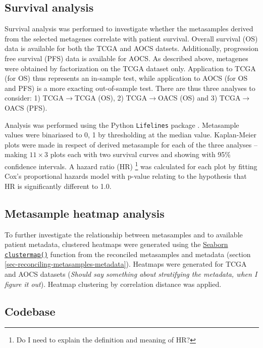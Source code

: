 \documentclass[draft, tikz, 12pt,a4paper,oneside,fleqn]{article}
\begin{document}
\subsection{Survival analysis}
\label{sec-survival-analysis}

Survival analysis was performed to investigate whether the metasamples derived from the selected metagenes correlate with patient survival.  Overall  survival (OS) data is available for both the TCGA and AOCS datsets.  Additionally, progression free survival (PFS) data is available for AOCS.   As described above,  metagenes were obtained by factorization on the TCGA dataset only.  Application to TCGA (for OS) thus represents an in-sample test, while application to AOCS (for OS and PFS) is a more exacting out-of-sample test. There are thus three analyses to consider: 1) TCGA$\rightarrow$TCGA (OS), 2) TCGA$\rightarrow$OACS (OS) and 3) TCGA$\rightarrow$OACS (PFS).

Analysis was performed using the Python {\tt Lifelines} package \cite{Davidson-Pilon2020}.  %
Metasample values were binariased to 0, 1 by thresholding at the median value.   Kaplan-Meier plots were made in respect of derived metasample for each of the three analyses -- making $11 \times 3$ plots each with two survival curves and showing with 95\% confidence intervals.  A hazard ratio (HR)
\footnote{Do I need to explain the definition and meaning of HR?}
was calculated for each plot by fitting Cox's proportional hazards model with p-value relating to the hypothesis that HR is significantly different to 1.0.


\subsection{Metasample heatmap analysis}

To further investigate the relationship between metasamples and to available patient metadata, clustered heatmaps were generated using the \href{https://seaborn.pydata.org/generated/seaborn.clustermap.html}{Seaborn {\tt clustermap()}} function from the reconciled metasamples and metadata (section \ref{sec-reconciling-metasamples-metadata}).  Heatmaps were generated for TCGA and AOCS datasets (\emph{Should say something about stratifying the metadata, when I figure it out}).  Heatmap clustering by correlation distance was applied.

\subsection{Codebase}
\end{document}
